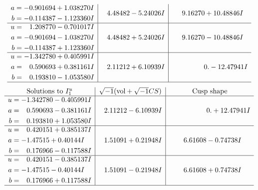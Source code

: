 \documentclass[1p]{elsarticle_modified}
\theoremstyle{definition}
\newcommand{\I}{\sqrt{-1}}
\begin{document}
$$\begin{array}{c|c|c}
\begin{aligned}
a &= -0.901694 + 1.038270 I \\
b &= -0.114387 - 1.123360 I\end{aligned}
 & \phantom{-}4.48482 - 5.24026 I & \phantom{-}9.16270 + 10.48846 I \\ \hline\begin{aligned}
u &= \phantom{-}1.208770 - 0.701017 I \\
a &= -0.901694 - 1.038270 I \\
b &= -0.114387 + 1.123360 I\end{aligned}
 & \phantom{-}4.48482 + 5.24026 I & \phantom{-}9.16270 - 10.48846 I \\ \hline\begin{aligned}
u &= -1.342780 + 0.405991 I \\
a &= \phantom{-}0.590693 + 0.381161 I \\
b &= \phantom{-}0.193810 - 1.053580 I\end{aligned}
 & \phantom{-}2.11212 + 6.10939 I & \phantom{-0.000000 } 0. - 12.47941 I\\
 \hline 
 \end{array}$$\newpage$$\begin{array}{c|c|c}  
\text{Solutions to }I^u_{1}& \I (\text{vol} + \sqrt{-1}CS) & \text{Cusp shape}\\
 \hline 
\begin{aligned}
u &= -1.342780 - 0.405991 I \\
a &= \phantom{-}0.590693 - 0.381161 I \\
b &= \phantom{-}0.193810 + 1.053580 I\end{aligned}
 & \phantom{-}2.11212 - 6.10939 I & \phantom{-0.000000 -}0. + 12.47941 I \\ \hline\begin{aligned}
u &= \phantom{-}0.420151 + 0.385137 I \\
a &= -1.47515 + 0.40144 I \\
b &= \phantom{-}0.176966 - 0.117588 I\end{aligned}
 & \phantom{-}1.51091 + 0.21948 I & \phantom{-}6.61608 - 0.74738 I \\ \hline\begin{aligned}
u &= \phantom{-}0.420151 - 0.385137 I \\
a &= -1.47515 - 0.40144 I \\
b &= \phantom{-}0.176966 + 0.117588 I\end{aligned}
 & \phantom{-}1.51091 - 0.21948 I & \phantom{-}6.61608 + 0.74738 I\\
 \hline 
 \end{array}$$\newpage\newpage\renewcommand{\arraystretch}{1}
\end{document}

